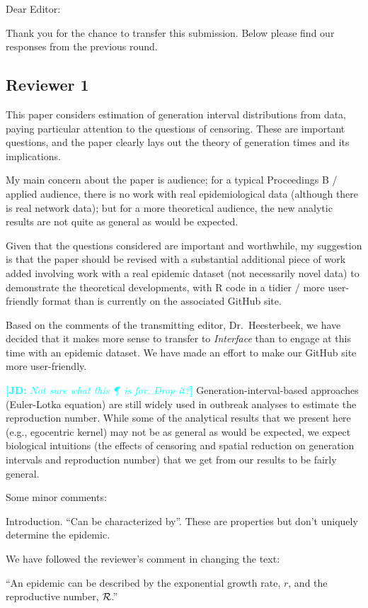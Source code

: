 \documentclass[12pt]{article}
\newcommand{\RR}{\ensuremath{{\cal R}}}
\newcommand{\rev}{\subsection*}
\newcommand{\revtext}{\textsf}
\newcommand{\comment}[3]{\textcolor{#1}{\textbf{[#2: }\textsl{#3}\textbf{]}}}
\newcommand{\jd}[1]{\comment{cyan}{JD}{#1}}
\begin{document}
\noindent Dear Editor:

Thank you for the chance to transfer this submission. 
Below please find our responses from the previous round.

\rev{Reviewer 1}

\revtext{This paper considers estimation of generation interval distributions from data, paying particular attention to the questions of censoring. These are important questions, and the paper clearly lays out the theory of generation times and its implications.}

\revtext{My main concern about the paper is audience; for a typical Proceedings B / applied audience, there is no work with real epidemiological data (although there is real network data); but for a more theoretical audience, the new analytic results are not quite as general as would be expected.}

\revtext{Given that the questions considered are important and worthwhile, my suggestion is that the paper should be revised with a substantial additional piece of work added involving work with a real epidemic dataset (not necessarily novel data) to demonstrate the theoretical developments, with R code in a tidier / more user-friendly format than is currently on the associated GitHub site.
}

Based on the comments of the transmitting editor, Dr.~Heesterbeek, we have decided that it makes more sense to transfer to \emph{Interface} than to engage at this time with an epidemic dataset. We have made an effort to make our GitHub site more user-friendly.

\jd{Not sure what this \P\ is for. Drop it?} Generation-interval-based approaches (Euler-Lotka equation) are still widely used in outbreak analyses to estimate the reproduction number. While some of the analytical results that we present here (e.g., egocentric kernel) may not be as general as would be expected, we expect biological intuitions (the effects of censoring and spatial reduction on generation intervals and reproduction number) that we get from our results to be fairly general. 


\revtext{Some minor comments:}

\revtext{Introduction. “Can be characterized by”. These are properties but don’t uniquely determine the epidemic.}

We have followed the reviewer's comment in changing the text:

``An epidemic can be described by the exponential growth rate, $r$, and the reproductive number, \RR.''
\end{document}
